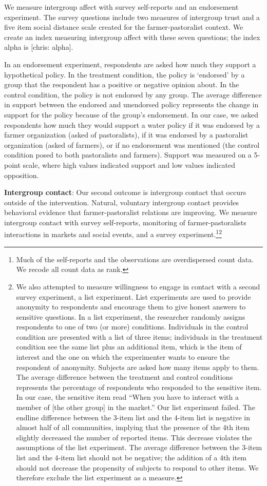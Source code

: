 \documentclass[11pt]{article}
\begin{document}
We measure intergroup affect with survey self-reports and an endorsement
experiment. The survey questions include two measures of intergroup
trust and a five item social distance scale created for the
farmer-pastoralist context. We create an index measuring intergroup
affect with these seven questions; the index alpha is {[}chris:
alpha{]}.

In an endorsement experiment, respondents are asked how much they
support a hypothetical policy. In the treatment condition, the policy is
`endorsed' by a group that the respondent has a positive or negative
opinion about. In the control condition, the policy is not endorsed by
any group. The average difference in support between the endorsed and
unendorsed policy represents the change in support for the policy
because of the group's endorsement. In our case, we asked respondents
how much they would support a water policy if it was endorsed by a
farmer organization (asked of pastoralists), if it was endorsed by a
pastoralist organization (asked of farmers), or if no endorsement was
mentioned (the control condition posed to both pastoralists and
farmers). Support was measured on a 5-point scale, where high values
indicated support and low values indicated opposition.

\textbf{Intergroup contact}: Our second outcome is intergroup contact
that occurs outside of the intervention. Natural, voluntary intergroup
contact provides behavioral evidence that farmer-pastoralist relations
are improving. We measure intergroup contact with survey self-reports,
monitoring of farmer-pastoralists interactions in markets and social
events, and a survey experiment.\footnote{Much of the self-reports and
  the observations are overdispersed count data. We recode all count
  data as rank.}\footnote{We also attempted to measure willingness to
  engage in contact with a second survey experiment, a list experiment.
  List experiments are used to provide anonymity to respondents and
  encourage them to give honest answers to sensitive questions. In a
  list experiment, the researcher randomly assigns respondents to one of
  two (or more) conditions. Individuals in the control condition are
  presented with a list of three items; individuals in the treatment
  condition see the same list plus an additional item, which is the item
  of interest and the one on which the experimenter wants to ensure the
  respondent of anonymity. Subjects are asked how many items apply to
  them. The average difference between the treatment and control
  conditions represents the percentage of respondents who responded to
  the sensitive item. In our case, the sensitive item read ``When you
  have to interact with a member of {[}the other group{]} in the
  market.'' Our list experiment failed. The endline difference between
  the 3-item list and the 4-item list is negative in almost half of all
  communities, implying that the presence of the 4th item slightly
  decreased the number of reported items. This decrease violates the
  assumptions of the list experiment. The average difference between the
  3-item list and the 4-item list should not be negative; the addition
  of a 4th item should not decrease the propensity of subjects to
  respond to other items. We therefore exclude the list experiment as a
  measure.}
\end{document}
